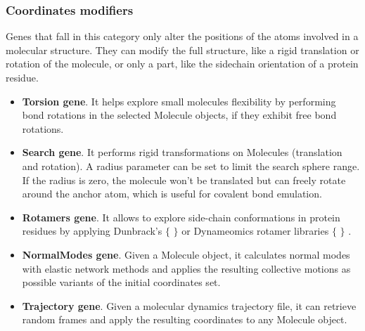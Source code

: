 \subsubsection{Coordinates modifiers}
Genes that fall in this category only alter the positions of the atoms involved in a molecular structure. They can modify the full structure, like a rigid translation or rotation of the molecule, or only a part, like the sidechain orientation of a protein residue.

\begin{itemize}
	\item \textbf{Torsion gene}. It helps explore small molecules flexibility by performing bond rotations in the selected Molecule objects, if they exhibit free bond rotations.

	\item \textbf{Search gene}. It performs rigid transformations on Molecules (translation and rotation). A radius parameter can be set to limit the search sphere range. If the radius is zero, the molecule won’t be translated but can freely rotate around the anchor atom, which is useful for covalent bond emulation.

	\item \textbf{Rotamers gene}. It allows to explore side-chain conformations in protein residues by applying Dunbrack’s $ \{ $ $ \} $  or Dynameomics rotamer libraries $ \{ $ $ \} $ .

	\item \textbf{NormalModes gene}. Given a Molecule object, it calculates normal modes with elastic network methods and applies the resulting collective motions as possible variants of the initial coordinates set.

	\item \textbf{Trajectory gene}. Given a molecular dynamics trajectory file, it can retrieve random frames and apply the resulting coordinates to any Molecule object.
\end{itemize}







